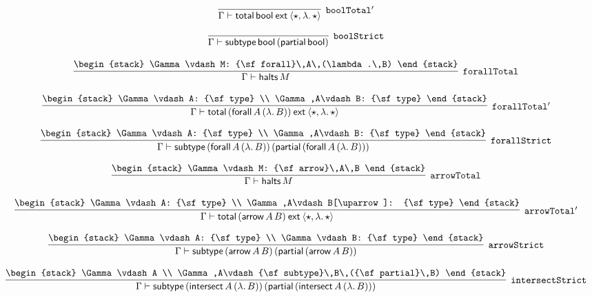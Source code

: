 \[
\infer[{\tt boolTotal'}]{\Gamma \vdash {\sf total}\,{\sf bool}\:{\sf ext}\:\langle \star ,\lambda .\,\star \rangle }{}
\]

\[
\infer[{\tt boolStrict}]{\Gamma \vdash {\sf subtype}\,{\sf bool}\,({\sf partial}\,{\sf bool})}{}
\]

\[
\infer[{\tt forallTotal}]{\Gamma \vdash {\sf halts}\,M}{
\begin{stack}
\Gamma \vdash M: {\sf forall}\,A\,(\lambda .\,B)
\end{stack}}
\]

\[
\infer[{\tt forallTotal'}]{\Gamma \vdash {\sf total}\,({\sf forall}\,A\,(\lambda .\,B))\:{\sf ext}\:\langle \star ,\lambda .\,\star \rangle }{
\begin{stack}
\Gamma \vdash A: {\sf type}
\\
\Gamma ,A\vdash B: {\sf type}
\end{stack}}
\]

\[
\infer[{\tt forallStrict}]{\Gamma \vdash {\sf subtype}\,({\sf forall}\,A\,(\lambda .\,B))\,({\sf partial}\,({\sf forall}\,A\,(\lambda .\,B)))}{
\begin{stack}
\Gamma \vdash A: {\sf type}
\\
\Gamma ,A\vdash B: {\sf type}
\end{stack}}
\]

\[
\infer[{\tt arrowTotal}]{\Gamma \vdash {\sf halts}\,M}{
\begin{stack}
\Gamma \vdash M: {\sf arrow}\,A\,B
\end{stack}}
\]

\[
\infer[{\tt arrowTotal'}]{\Gamma \vdash {\sf total}\,({\sf arrow}\,A\,B)\:{\sf ext}\:\langle \star ,\lambda .\,\star \rangle }{
\begin{stack}
\Gamma \vdash A: {\sf type}
\\
\Gamma ,A\vdash B[\uparrow ]: {\sf type}
\end{stack}}
\]

\[
\infer[{\tt arrowStrict}]{\Gamma \vdash {\sf subtype}\,({\sf arrow}\,A\,B)\,({\sf partial}\,({\sf arrow}\,A\,B))}{
\begin{stack}
\Gamma \vdash A: {\sf type}
\\
\Gamma \vdash B: {\sf type}
\end{stack}}
\]

\[
\infer[{\tt intersectStrict}]{\Gamma \vdash {\sf subtype}\,({\sf intersect}\,A\,(\lambda .\,B))\,({\sf partial}\,({\sf intersect}\,A\,(\lambda .\,B)))}{
\begin{stack}
\Gamma \vdash A
\\
\Gamma ,A\vdash {\sf subtype}\,B\,({\sf partial}\,B)
\end{stack}}
\]

